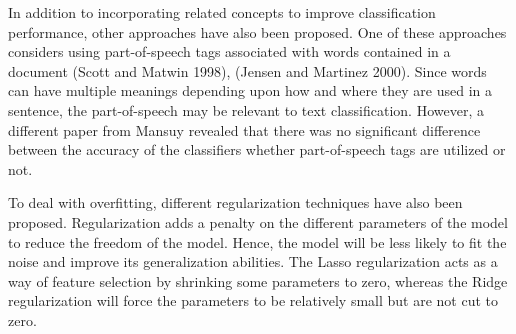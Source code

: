 In addition to incorporating related concepts to improve classification performance, other approaches have also been proposed. One of these approaches considers using part-of-speech tags associated with words contained in a document (Scott and Matwin \cite{scott1998text} 1998), (Jensen and Martinez \cite{jensen2000improving} 2000). Since words can have multiple meanings depending upon how and where they are used in a sentence, the part-of-speech may be relevant to text classification. However, a different paper from Mansuy \cite{mansuy2006characterization} revealed that there was no significant difference between the accuracy of the classifiers whether part-of-speech tags are utilized or not.

To deal with overfitting, different regularization techniques have also been proposed. Regularization adds a penalty on the different parameters of the model to reduce the freedom of the model. Hence, the model will be less likely to fit the noise and improve its generalization abilities. The Lasso regularization acts as a way of feature selection by shrinking some parameters to zero, whereas the Ridge regularization will force the parameters to be relatively small but are not cut to zero.